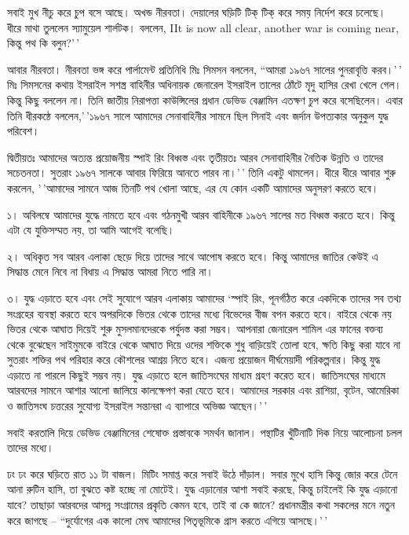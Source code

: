 \documentclass[
]{book}
\begin{document}
সবাই মুখ নীচু করে চুপ বসে আছে। অখন্ড নীরবতা। দেয়ালের ঘড়িটি টিক্ টিক্ করে সময় নির্দেশ করে চলেছে। ধীরে মাথা তুললেন স্যামুয়েল শার্লটক। বললেন, IIt is now all clear, another war is coming near, কিন্তু পথ কি বলুন?'\,'

আবার নীরবতা। নীরবতা ভঙ্গ করে পার্লামেন্ট প্রতিনিধি মিঃ সিমসন বললেন, ``আমরা ১৯৬৭ সালের পুনরাবৃত্তি করব।'\,' মিঃ সিমসনের কথায় ইসরাইল সশস্ত্র বাহিনীর অধিনায়ক জেনারেল ইসরাইল তালের ঠোঁটে মৃদু হাসির রেখা খেলে গেল। কিন্তু কিছু বললেন না। তিনি জাতীয় নিরাপত্তা কাউন্সিলের প্রধান ডেভিড বেঞ্জামিন এতক্ষণ চুপ করে বসেছিলেন। এবার তিনি ধীরকন্ঠে বললেন,'\,'১৯৬৭ সালে আমাদের সেনাবাহিনীর সামনে ছিল সিনাই এবং জর্দান উপত্যকার অনুকুল যুদ্ধ পরিবেশ।

দ্বিতীয়তঃ আমাদের অত্যন্ত প্রয়োজনীয় স্পাই রিং বিধ্বস্ত এবং তৃতীয়তঃ আরব সেনাবাহিনীর নৈতিক উন্নতি ও তাদের সচেতনতা। সুতরাং ১৯৬৭ সালকে আবার ফিরিয়ে আনতে পারব না।'\,' তিনি একটু থামলেন। ধীরে ধীরে আবার শুরু করলেন, '\,'আমাদের সামনে আজ তিনটি পথ খোলা আছে, এর যে কোন একটি আমাদের অনুসরণ করতে হবে।

১। অবিলম্বে আমাদের যুদ্ধে নামতে হবে এবং গঠনমুখী আরব বাহিনীকে ১৯৬৭ সালের মত বিধ্বস্ত করতে হবে। কিন্তু এটা যে যুক্তিসম্মত নয়, তা আমি আগেই বলেছি।

২। অধিকৃত সব আরব এলাকা ছেড়ে দিয়ে তাদের সাথে আপোষ করতে হবে। কিন্তু আমাদের জাতির কেউই এ সিদ্ধান্ত মেনে নিবে না বিধায় এ সিদ্ধান্ত আমরা নিতে পারি না।

৩। যুদ্ধ এড়াতে হবে এবং সেই সুযোগে আরব এলাকায় আমাদের `স্পাই রিং, পূনর্গঠিত করে একদিকে তাদের সব তথ্য সংগ্রহের ব্যবস্থা করতে হবে অপরদিকে ভিতর থেকে তাদের মধ্যে বিভেদের বীজ বপন করতে হবে। বাইরে থেকে নয় ভিতর থেকে আঘাত দিয়েই শুরু মুসলমানদেরকে পর্যুদস্ত করা সম্ভব। আপনারা জেনারেল শামিল এর ফানের বক্তব্য থেকে বুঝেছেন সাইমুমকে বাইরে থেকে আঘাত দিয়ে ওদের শক্তিকে শুধু বাড়িয়েই তোলা হবে, ক্ষতি কিছু করা যাবে না সুতরাং শক্তির পথ পরিহার করে কৌশলের আশ্রয় নিতে হবে। এজন্য প্রয়োজন দীর্ঘমেয়াদী পরিকল্পনার। কিন্তু যুদ্ধ এড়াতে না পারলে কিছুই সম্ভব নয়। যুদ্ধ এড়াতে হলে জাতিসংঘের মাধ্যম গ্রহণ করেত হবে। জাতিসংঘের মাধ্যমে আরবদের সামনে আশার আলো জালিয়ে কালক্ষেপণ করা যেতে হবে। আমাদের সরকার এবং রাশিয়া, বৃটেন, আমেরিকা ও জাতিসংঘ চত্তরের সুযোগ্য ইসরাইল সন্তানরা এ ব্যাপারে অভিজ্ঞ আছেন।'\,'

সবাই করতালি দিয়ে ডেভিড বেঞ্জামিনের শেষোক্ত প্রস্তাবকে সমর্থন জানাল। পন্থাটির খুঁটিনাটি দিক নিয়ে আলোচনা চলল তাদের মধ্যে।

ঢং ঢং করে ঘড়িতে রাত ১১ টা বাজল। মিটিং সমাপ্ত করে সবাই উঠে দাঁড়াল। সবার মুখে হাসি কিন্তু জোর করে টেনে আনা রুটিন হাসি, তা বুঝতে কষ্ট হচ্ছে না মোটেই। যুদ্ধ এড়ানোর আশা সবাই করছে, কিন্তু চাইলেই কি যুদ্ধ এড়ানো যাবে? তাছাড়া আরবদের আসন্ন সংগ্রামের প্রকৃতি কেমন হবে, তাই বা কে জানে? প্রধানমন্ত্রীর কথা সকলের মনে নতুন করে জাগছে -- ``দুর্যোগের এক কালো মেঘ আমাদের পিতৃভূমিকে গ্রাস করতে এগিয়ে আসছে।'\,'
\end{document}
